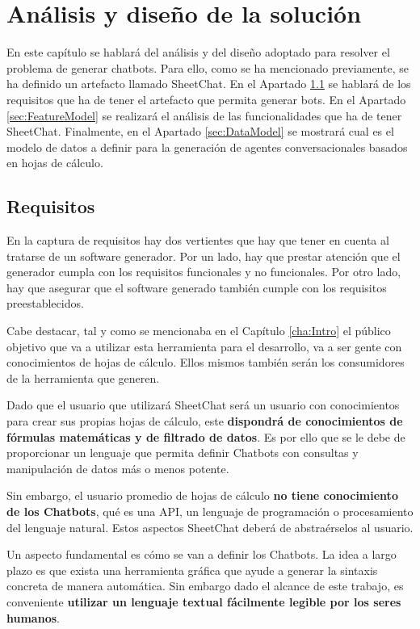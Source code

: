 \chapter{Análisis y diseño de la solución}
\label{cha:AnalysisAndDesign}

En este capítulo se hablará del análisis y del diseño adoptado para resolver el problema de generar chatbots. Para ello, como se ha mencionado previamente, se ha definido un artefacto llamado SheetChat. En el Apartado \ref{sec:Requisitos} se hablará de los requisitos que ha de tener el artefacto que permita generar bots. En el Apartado \ref{sec:FeatureModel} se realizará el análisis de las funcionalidades que ha de tener SheetChat. Finalmente, en el Apartado \ref{sec:DataModel} se mostrará cual es el modelo de datos a definir para la generación de agentes conversacionales basados en hojas de cálculo.

\section{Requisitos}
\label{sec:Requisitos}

En la captura de requisitos hay dos vertientes que hay que tener en cuenta al tratarse de un software generador. Por un lado, hay que prestar atención que el generador cumpla con los requisitos funcionales y no funcionales. Por otro lado, hay que asegurar que el software generado también cumple con los requisitos preestablecidos.

Cabe destacar, tal y como se mencionaba en el Capítulo \ref{cha:Intro} el público objetivo que va a utilizar esta herramienta para el desarrollo, va a ser gente con conocimientos de hojas de cálculo. Ellos mismos también serán los consumidores de la herramienta que generen.

Dado que el usuario que utilizará SheetChat será un usuario con conocimientos para crear sus propias hojas de cálculo, este \textbf{dispondrá de conocimientos de fórmulas matemáticas y de filtrado de datos}. Es por ello que se le debe de proporcionar un lenguaje que permita definir Chatbots con consultas y manipulación de datos más o menos potente.

Sin embargo, el usuario promedio de hojas de cálculo \textbf{no tiene conocimiento de los Chatbots}, qué es una API, un lenguaje de programación o procesamiento del lenguaje natural. Estos aspectos SheetChat deberá de abstraérselos al usuario.

Un aspecto fundamental es cómo se van a definir los Chatbots. La idea a largo plazo es que exista una herramienta gráfica que ayude a generar la sintaxis concreta de manera automática. Sin embargo dado el alcance de este trabajo, es conveniente \textbf{utilizar un lenguaje textual fácilmente legible por los seres humanos}.

